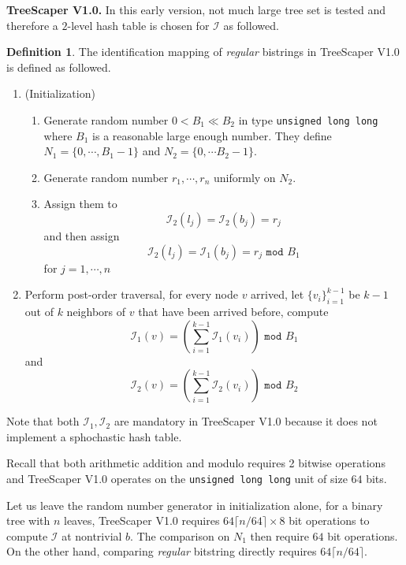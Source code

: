 \documentclass[11pt]{article}
\theoremstyle{definition}
\newtheorem{defn}{Definition}[section]
\theoremstyle{remark}
\theoremstyle{plain}
\begin{document}
\noindent\textbf{TreeScaper V1.0.} In this early version, not much large tree set is tested and therefore a $2$-level hash table is chosen for $\mathcal{I}$ as followed.
\begin{defn}
	The identification mapping of \emph{regular} bistrings in TreeScaper V1.0 is defined as followed. 
	\begin{enumerate}
		\item (Initialization) 
		\begin{enumerate}
			\item Generate random number $0 <B_1\ll B_2$ in type \texttt{unsigned long long} where $B_1$ is a reasonable large enough number. They define $N_1 = \{0,\cdots, B_1-1\}$ and $N_2 = \{0,\cdots B_2-1\}$.
			\item Generate random number $r_1,\cdots, r_n$ uniformly on $N_2$.
			\item Assign them to $$\mathcal{I}_2(l_j) = \mathcal{I}_2(b_j) = r_j$$ and then assign $$\mathcal{I}_2(l_j) = \mathcal{I}_1(b_j) = r_j \texttt{ mod } B_1$$ for $j = 1,\cdots, n$
		\end{enumerate}
		\item Perform post-order traversal, for every node $v$ arrived, let $\{v_i\}_{i=1}^{k-1}$ be $k-1$ out of $k$ neighbors of $v$ that have been arrived before, compute
		\[
			\mathcal{I}_1(v) = \left(\sum_{i=1}^{k-1} \mathcal{I}_1(v_i)\right) \texttt{ mod } B_1
		\]
		and 
		\[
			\mathcal{I}_2(v) = \left(\sum_{i=1}^{k-1} \mathcal{I}_2(v_i)\right) \texttt{ mod } B_2
		\]
	\end{enumerate}

	Note that both $\mathcal{I}_1, \mathcal{I}_2$ are mandatory in TreeScaper V1.0 because it does not implement a sphochastic hash table.
\end{defn}

Recall that both arithmetic addition and modulo requires 2 bitwise operations and TreeScaper V1.0 operates on the \texttt{unsigned long long} unit of size $64$ bits. 

Let us leave the random number generator in initialization alone, for a binary tree with $n$ leaves, TreeScaper V1.0 requires $64\lceil n/64\rceil\times 8$ bit operations to compute $\mathcal{I}$ at nontrivial $b$. The comparison on $N_1$ then require $64$ bit operations. On the other hand, comparing \emph{regular} bitstring directly requires $64\lceil n/64\rceil$. 
\end{document}
